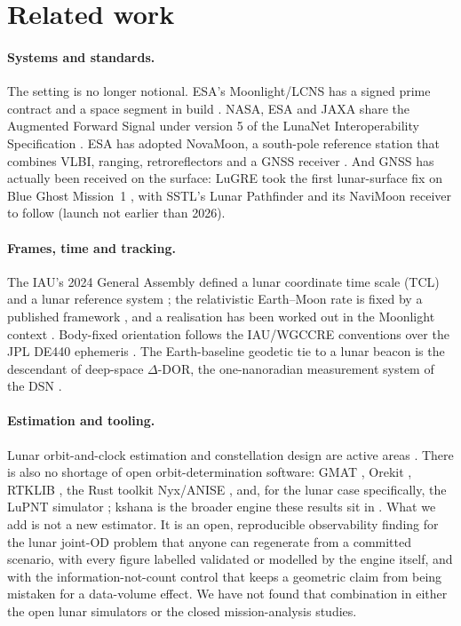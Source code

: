 \section{Related work}

\paragraph{Systems and standards.}
The setting is no longer notional. ESA's Moonlight/LCNS has a signed prime
contract and a space segment in build \citep{esa_moonlight,telespazio2024moonlight}.
NASA, ESA and JAXA share the Augmented Forward Signal under version 5 of the
LunaNet Interoperability Specification \citep{nasa2025lnis,nasa2025afs}. ESA has
adopted NovaMoon, a south-pole reference station that combines VLBI, ranging,
retroreflectors and a GNSS receiver \citep{molli2026novamoon}. And GNSS has
actually been received on the surface: LuGRE took the first lunar-surface fix on
Blue Ghost Mission~1 \citep{lugre2026}, with SSTL's Lunar Pathfinder and its
NaviMoon receiver to follow (launch not earlier than 2026).

\paragraph{Frames, time and tracking.}
The IAU's 2024 General Assembly defined a lunar coordinate time scale (TCL) and a
lunar reference system \citep{iau2024lcrs}; the relativistic Earth--Moon rate is
fixed by a published framework \citep{ashby2024lunartime}, and a realisation has
been worked out in the Moonlight context
\citep{fienga2024moonlight,bourgoin2026lunartime}. Body-fixed orientation follows
the IAU/WGCCRE conventions \citep{archinal2018wgccre} over the JPL DE440
ephemeris \citep{park2021de440}. The Earth-baseline geodetic tie to a lunar
beacon is the descendant of deep-space $\Delta$-DOR, the one-nanoradian
measurement system of the DSN \citep{curkendall2013deltador}.

\paragraph{Estimation and tooling.}
Lunar orbit-and-clock estimation and constellation design are active areas
\citep{iiyama2026odclock,bhamidipati2023constellation}. There is also no shortage
of open orbit-determination software: GMAT \citep{nasa_gmat}, Orekit
\citep{orekit}, RTKLIB \citep{takasu2009}, the Rust toolkit Nyx/ANISE
\citep{nyxspace2025}, and, for the lunar case specifically, the LuPNT simulator
\citep{iiyama2023lupnt}; kshana is the broader engine these results sit in
\citep{baweja2026kshana}. What we add is not a new estimator. It is an open,
reproducible observability finding for the lunar joint-OD problem that anyone can
regenerate from a committed scenario, with every figure labelled validated or
modelled by the engine itself, and with the information-not-count control that
keeps a geometric claim from being mistaken for a data-volume effect. We have not
found that combination in either the open lunar simulators or the closed
mission-analysis studies.

